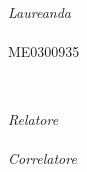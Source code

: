 \begin{titlepage}
\begin{center}
	
	\vfill
	
	{\huge\bfseries \theTitle}\\ [0.2cm] %
	
	{\huge \theSubject}\\ [0.2cm] %
	
	\vfill\vfill
	
	
	\begin{minipage}{0.4\textwidth}
		\begin{flushleft}
			\large
			\textit{Laureanda}\\
			\theAuthor\\ %
			\small{ME0300935}
		\end{flushleft}
	\end{minipage}
	~
	\begin{minipage}{0.4\textwidth}
		\begin{flushright}
			\large
			\textit{Relatore}  \\
			\theFirstSupervisor \\ %
			\bigskip
			\textit{Correlatore}\\ 
			\theSecondSupervisor \\ %
		\end{flushright}
	\end{minipage}
	
	
	\vfill\vfill\vfill
	
	{\large \textsc{\theDate}}
	
	\vfill
	\end{center}


\end{titlepage}

